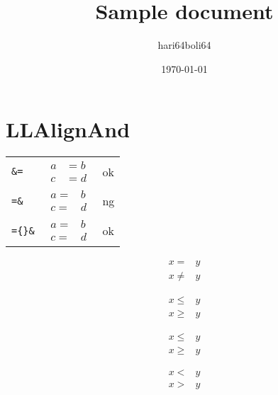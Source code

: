 \documentclass[a4paper]{article}
\newcommand{\tA}[1]{\textcolor{cA}{#1}}
\newcommand{\tD}[1]{\textcolor{cD}{#1}}
\begin{document}
\title{Sample document}
\author{hari64boli64}
\date{\today}
\maketitle

\section{LLAlignAnd}

\begin{table}[H]
	\centering
	\begin{tabular}{lll}
		\verb|&=|        &
		$\begin{aligned}
				 a & = b \\
				 c & = d
			 \end{aligned}$ &
		\tA{ok}            \\[0.3cm]
		\verb|=&|        &
		$\begin{aligned}
				 a = & b \\
				 c = & d
			 \end{aligned}$ &
		\tD{ng}            \\[0.3cm]
		\verb|={}&|      &
		$\begin{aligned}
				 a = {} & b \\
				 c = {} & d
			 \end{aligned}$ &
		\tA{ok}
	\end{tabular}
\end{table}

\begin{center}
	\begin{minipage}{.1\columnwidth}
		\begin{align*}
			x
			=
			 &
			y
			\\
			x
			\neq
			 &
			y
		\end{align*}
	\end{minipage}%
	\begin{minipage}{.1\columnwidth}
		\begin{equation*}
			\begin{split}
				x \leq & y \\
				x \geq & y
			\end{split}
		\end{equation*}
	\end{minipage}%
	\begin{minipage}{.1\columnwidth}
		\begin{align*}
			x \le & y \\
			x \ge & y
		\end{align*}
	\end{minipage}%
	\begin{minipage}{.1\columnwidth}
		\begin{align*}
			x < & y \\
			x > & y
		\end{align*}
	\end{minipage}
\end{center}
\end{document}

